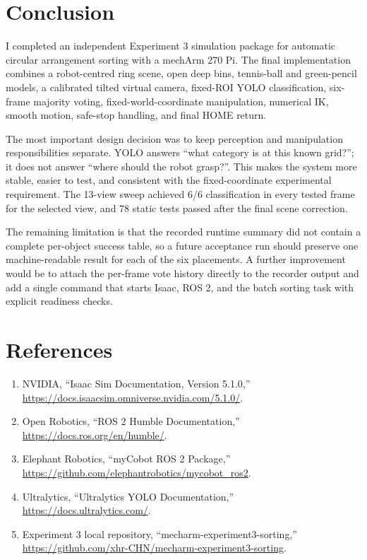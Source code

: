\documentclass[12pt,a4paper]{article}
\begin{document}
\section{Conclusion}

I completed an independent Experiment 3 simulation package for automatic circular arrangement sorting with a mechArm 270 Pi. The final implementation combines a robot-centred ring scene, open deep bins, tennis-ball and green-pencil models, a calibrated tilted virtual camera, fixed-ROI YOLO classification, six-frame majority voting, fixed-world-coordinate manipulation, numerical IK, smooth motion, safe-stop handling, and final HOME return.

The most important design decision was to keep perception and manipulation responsibilities separate. YOLO answers ``what category is at this known grid?''; it does not answer ``where should the robot grasp?''. This makes the system more stable, easier to test, and consistent with the fixed-coordinate experimental requirement. The 13-view sweep achieved 6/6 classification in every tested frame for the selected view, and 78 static tests passed after the final scene correction.

The remaining limitation is that the recorded runtime summary did not contain a complete per-object success table, so a future acceptance run should preserve one machine-readable result for each of the six placements. A further improvement would be to attach the per-frame vote history directly to the recorder output and add a single command that starts Isaac, ROS 2, and the batch sorting task with explicit readiness checks.

\section*{References}
\begingroup\sloppy
\begin{enumerate}
  \item NVIDIA, ``Isaac Sim Documentation, Version 5.1.0,'' \url{https://docs.isaacsim.omniverse.nvidia.com/5.1.0/}.
  \item Open Robotics, ``ROS 2 Humble Documentation,'' \url{https://docs.ros.org/en/humble/}.
  \item Elephant Robotics, ``myCobot ROS 2 Package,'' \url{https://github.com/elephantrobotics/mycobot_ros2}.
  \item Ultralytics, ``Ultralytics YOLO Documentation,'' \url{https://docs.ultralytics.com/}.
  \item Experiment 3 local repository, ``mecharm-experiment3-sorting,'' \url{https://github.com/xhr-CHN/mecharm-experiment3-sorting}.
\end{enumerate}
\endgroup
\end{document}
